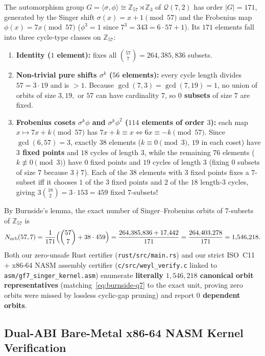 \documentclass[11pt,letterpaper]{article}
\theoremstyle{plain}
\theoremstyle{definition}
\theoremstyle{remark}
\newcommand{\Z}{\mathbb{Z}}
\newcommand{\Qcode}{\mathcal{Q}}
\begin{document}
The automorphism group $G=\langle\sigma,\phi\rangle\cong \Z_{57}\rtimes\Z_3$ of $\Qcode(7,2)$ has order $|G|=171$, generated by the Singer shift $\sigma(x)=x+1\pmod{57}$ and the Frobenius map $\phi(x)=7x\pmod{57}$ ($\phi^3=1$ since $7^3=343=6\cdot 57+1$). Its $171$ elements fall into three cycle-type classes on $\Z_{57}$:
\begin{enumerate}[leftmargin=2em,itemsep=2pt]
  \item \textbf{Identity ($1$ element):} fixes all $\binom{57}{7} = 264{,}385{,}836$ subsets.
  \item \textbf{Non-trivial pure shifts $\sigma^k$ ($56$ elements):} every cycle length divides $57=3\cdot 19$ and is $>1$. Because $\gcd(7,3)=\gcd(7,19)=1$, no union of orbits of size $3,19,$ or $57$ can have cardinality $7$, so \textbf{$0$ subsets} of size $7$ are fixed.
  \item \textbf{Frobenius cosets $\sigma^k\phi$ and $\sigma^k\phi^2$ ($114$ elements of order $3$):} each map $x\mapsto 7x+k\pmod{57}$ has $7x+k\equiv x\iff 6x\equiv -k\pmod{57}$. Since $\gcd(6,57)=3$, exactly $38$ elements ($k\equiv 0\pmod 3$, $19$ in each coset) have \textbf{$3$ fixed points} and $18$ cycles of length $3$, while the remaining $76$ elements ($k\not\equiv 0\pmod 3$) have $0$ fixed points and $19$ cycles of length $3$ (fixing $0$ subsets of size $7$ because $3\nmid 7$). Each of the $38$ elements with $3$ fixed points fixes a $7$-subset iff it chooses $1$ of the $3$ fixed points and $2$ of the $18$ length-$3$ cycles, giving $3\binom{18}{2}=3\cdot 153 = 459$ fixed $7$-subsets!
\end{enumerate}
By Burnside's lemma, the exact number of Singer--Frobenius orbits of $7$-subsets of $\Z_{57}$ is
\begin{equation}
\label{eq:burnside-q7}
  N_{\mathrm{orb}}(57,7)
  = \frac{1}{171}\Bigl(\binom{57}{7} + 38\cdot 459\Bigr)
  = \frac{264{,}385{,}836 + 17{,}442}{171}
  = \frac{264{,}403{,}278}{171}
  = 1{,}546{,}218.
\end{equation}
Both our zero-unsafe Rust certifier (\texttt{rust/src/main.rs}) and our strict ISO~C11 + x86-64 NASM assembly certifier (\texttt{c/src/weyl\_verify.c} linked to \texttt{asm/gf7\_singer\_kernel.asm}) enumerate \textbf{literally $1{,}546{,}218$ canonical orbit representatives} (matching~\eqref{eq:burnside-q7} to the exact unit, proving zero orbits were missed by lossless cyclic-gap pruning) and report \textbf{$0$ dependent orbits}.

\subsection{Dual-ABI Bare-Metal x86-64 NASM Kernel Verification}
\end{document}
